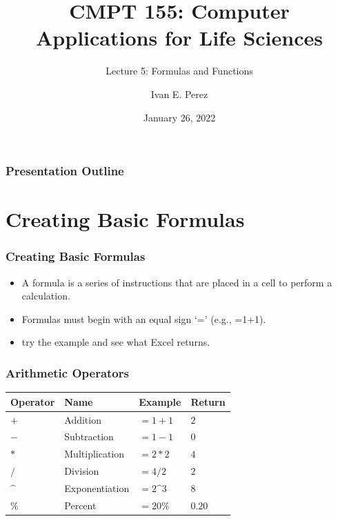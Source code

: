 \documentclass[12pt]{beamer}
\title{CMPT 155: Computer Applications for Life Sciences}
\subtitle{Lecture 5: Formulas and Functions}
\author{Ivan E. Perez}
\institute{}
\date{January 26, 2022}
\begin{document}
	
	\begin{frame}
		\titlepage
	\end{frame}
	
	\begin{frame}
		\frametitle{Presentation Outline}
		\tableofcontents
	\end{frame}
	\section{Creating Basic Formulas}
	
	\begin{frame}
		\frametitle{Creating Basic Formulas}
		\begin{itemize}
			\item A formula is a series of instructions that are placed in a cell to perform a calculation.
			\item Formulas must begin with an equal sign `=' (e.g., =1+1).
			\item try the example and see what Excel returns.
		\end{itemize}
	\end{frame}

	\begin{frame}
		\frametitle{Arithmetic Operators}
		\begin{center}
			\begin{tabular}{llll}
				Operator & Name & Example & Return\\
				\hline
				$+$ & Addition & $=1+1$ & $2$ \\
				$-$ & Subtraction & $=1-1$ & $0$ \\
				$*$ & Multiplication& $=2*2$ & $4$ \\
				$/$ & Division & $=4/2$ & $2$\\
				$\sphat$ & Exponentiation&  $=2 \sphat 3$ & $8$ \\
				$\%$ & Percent & $=20\%$ & $0.20$
			\end{tabular}
		\end{center}
	\end{frame}
\end{document}
